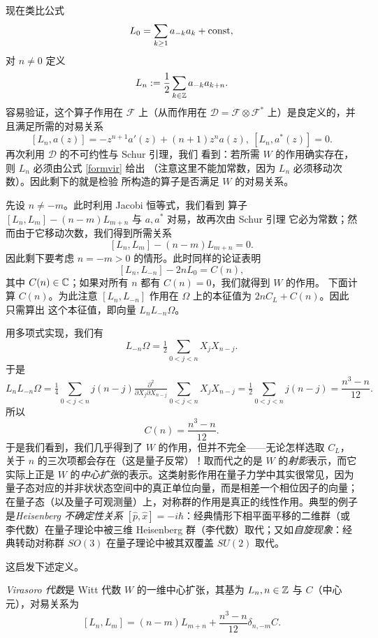 现在类比公式
$$
L_0=\sum_{k\ge 1} a_{-k}a_k+{\rm const},
$$ 
对 $n\ne 0$ 定义
\begin{equation}\label{formvir}
L_n:=\frac{1}{2}\sum_{k\in \Bbb Z}a_{-k}a_{k+n}.
\end{equation} 
容易验证，这个算子作用在 $\mathcal F$ 上（从而作用在
$\mathcal D=\mathcal F\otimes \mathcal F^*$ 上）是良定义的，并且满足所需的对易关系
$$
[L_n,a(z)]=-z^{n+1}a'(z)+(n+1)z^na(z),\ [L_n,a^*(z)]=0.
$$
再次利用 $\mathcal D$ 的不可约性与 Schur 引理，我们
看到：若所需 $W$ 的作用确实存在，则 $L_n$ 必须由公式 \eqref{formvir} 给出
（注意这里不能加常数，因为 $L_n$ 必须移动次数）。因此剩下的就是检验
所构造的算子是否满足 $W$ 的对易关系。

先设 $n\ne -m$。此时利用 Jacobi 恒等式，我们看到
算子 $[L_n,L_m]-(n-m)L_{m+n}$ 与 $a,a^*$ 对易，故再次由 Schur 引理
它必为常数；然而由于它移动次数，我们得到所需关系
$$
[L_n,L_m]-(n-m)L_{m+n}=0.
$$
因此剩下要考虑 $n=-m>0$ 的情形。此时同样的论证表明
$$
[L_n,L_{-n}]-2nL_0=C(n), 
$$
其中 $C(n)\in \Bbb C$；如果对所有 $n$ 都有 $C(n)=0$，我们就得到 $W$ 的作用。
下面计算 $C(n)$。为此注意 $[L_n,L_{-n}]$ 作用在 $\Omega$ 上的本征值为 $2nC_L+C(n)$。因此只需算出
这个本征值，即向量 $L_nL_{-n}\Omega$。

用多项式实现，我们有
$$
L_{-n}\Omega=\tfrac{1}{2}\sum_{0<j<n}X_jX_{n-j}.
$$
于是
$$
L_nL_{-n}\Omega=\tfrac{1}{4}\sum_{0<j<n}j(n-j)\tfrac{\partial^2}{\partial X_j\partial X_{n-j}}\sum_{0<j<n}X_jX_{n-j}=
\tfrac{1}{2}\sum_{0<j<n}j(n-j)=\frac{n^3-n}{12}.
$$
所以
$$
C(n)=\frac{n^3-n}{12}.
$$
于是我们看到，我们几乎得到了 $W$ 的作用，但并不完全——无论怎样选取 $C_L$，关于 $n$ 的三次项都会存在（这是量子反常）！取而代之的是 $W$ 的\emph{射影}表示，而它实际上正是 $W$ 的\emph{中心扩张}的表示。这类射影作用在量子力学中其实很常见，因为量子态对应的并非状状态空间中的真正单位向量，而是相差一个相位因子的向量；在量子态（以及量子可观测量）上，对称群的作用是真正的线性作用。典型的例子是\emph{Heisenberg 不确定性关系} $[\widehat p,\widehat x]=-i\hbar$：经典情形下相平面平移的二维群（或李代数）在量子理论中被三维 Heisenberg 群（李代数）取代；又如\emph{自旋现象}：经典转动对称群 $SO(3)$ 在量子理论中被其双覆盖 $SU(2)$ 取代。

这启发下述定义。

\begin{definition} \emph{Virasoro 代数}是 Witt 代数 $W$ 的一维中心扩张，其基为 $L_n,n\in \Bbb Z$ 与
$C$（中心元），对易关系为
$$
[L_n,L_m]=(n-m)L_{m+n}+\frac{n^3-n}{12}\delta_{n,-m}C.
$$
\end{definition} 

